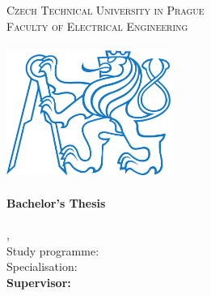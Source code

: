 
\begin{titlepage}
  \begin{center}

    \textsc{\Large Czech Technical University in Prague}\\[1em]
    \textsc{\large Faculty of Electrical Engineering\\
    \Department\\[3em]
    }
    \includegraphics[height=4.1cm]{src/fig/pdfs/ctu_logo_blue.pdf}\\[3em]

    \textbf{\textsc{\Huge \Title}}\\[2em]

    \textbf{\Large Bachelor's Thesis}\\[6em]

    \textbf{\huge \Author}\\[6em]

    {\large \Location, \Date}\\[3em]

    Study programme: \Programme\\
    Specialisation: \Field\\[4em]

    \textbf{Supervisor: \Supervisor}\\

    \vspace{2pt}

  \end{center}
\end{titlepage}
